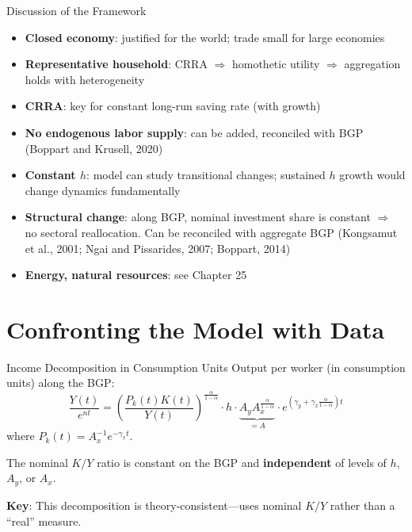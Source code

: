 \documentclass[blue]{beamer}
\begin{document}
\begin{frame}{Discussion of the Framework}
	\begin{itemize}
		\item \textbf{Closed economy}: justified for the world; trade small for large economies
		\item \textbf{Representative household}: CRRA $\Rightarrow$ homothetic utility $\Rightarrow$ aggregation holds with heterogeneity
		\item \textbf{CRRA}: key for constant long-run saving rate (with growth)
		\item \textbf{No endogenous labor supply}: can be added, reconciled with BGP (Boppart and Krusell, 2020)
		\item \textbf{Constant $h$}: model can study transitional changes; sustained $h$ growth would change dynamics fundamentally
		\item \textbf{Structural change}: along BGP, nominal investment share is constant $\Rightarrow$ no sectoral reallocation. Can be reconciled with aggregate BGP (Kongsamut et al., 2001; Ngai and Pissarides, 2007; Boppart, 2014)
		\item \textbf{Energy, natural resources}: see Chapter 25
	\end{itemize}
\end{frame}


\section{Confronting the Model with Data}

\begin{frame}{Income Decomposition in Consumption Units}
	Output per worker (in consumption units) along the BGP:
	\[
	\frac{Y(t)}{e^{nt}} = \left(\frac{P_k(t)K(t)}{Y(t)}\right)^{\!\frac{\alpha}{1-\alpha}} \cdot h \cdot \underbrace{A_y A_x^{\frac{\alpha}{1-\alpha}}}_{= A} \cdot e^{(\gamma_y + \gamma_x \frac{\alpha}{1-\alpha})t} 
	\]
	where $P_k(t) = A_x^{-1} e^{-\gamma_x t}$.
	
	\bigskip
	The nominal $K/Y$ ratio is constant on the BGP and \textbf{independent} of levels of $h$, $A_y$, or $A_x$.
	
	\bigskip
	\textbf{Key}: This decomposition is theory-consistent---uses nominal $K/Y$ rather than a ``real'' measure.
\end{frame}
\end{document}
